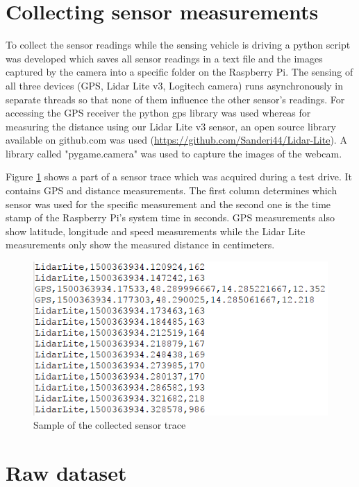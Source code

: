 \section{Collecting sensor measurements}

To collect the sensor readings while the sensing vehicle is driving a python script was developed which saves all sensor readings in a text file and the images captured by the camera into a specific folder on the Raspberry Pi. The sensing of all three devices (GPS, Lidar Lite v3, Logitech camera) runs asynchronously in separate threads so that none of them influence the other sensor's readings. For accessing the GPS receiver the python gps library was used whereas for measuring the distance using our Lidar Lite v3 sensor, an open source library available on github.com was used (\url{https://github.com/Sanderi44/Lidar-Lite}). A library called "pygame.camera" was used to capture the images of the webcam. 

Figure \ref{fig:sample_sensor_trace} shows a part of a sensor trace which was acquired during a test drive. It contains GPS and distance measurements. The first column determines which sensor was used for the specific measurement and the second one is the time stamp of the Raspberry Pi's system time in seconds. GPS measurements also show latitude, longitude and speed measurements while the Lidar Lite measurements only show the measured distance in centimeters.

\begin{figure}
	\centering
	\includegraphics{img/sample-sensor-trace.PNG}
	\caption{Sample of the collected sensor trace}
	\label{fig:sample_sensor_trace}
\end{figure}




\section{Raw dataset}


